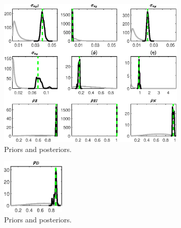  
\begin{figure}[H]
\centering
\includegraphics[width=0.80\textwidth]{BRS_comovement/Output/BRS_comovement_PriorsAndPosteriors1}
\caption{Priors and posteriors.}\label{Fig:PriorsAndPosteriors:1}
\end{figure}
 
\begin{figure}[H]
\centering
\includegraphics[width=0.27\textwidth]{BRS_comovement/Output/BRS_comovement_PriorsAndPosteriors2}
\caption{Priors and posteriors.}\label{Fig:PriorsAndPosteriors:2}
\end{figure}
 
